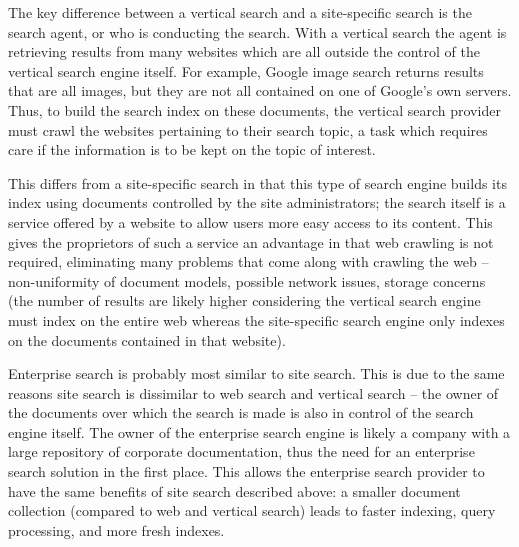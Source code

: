 The key difference between a vertical search and a site-specific search is the search agent, or who is conducting the search.  With a vertical search the agent is retrieving results from many websites which are all outside the control of the vertical search engine itself.  For example, Google image search returns results that are all images, but they are not all contained on one of Google's own servers.  Thus, to build the search index on these documents, the vertical search provider must crawl the websites pertaining to their search topic, a task which requires care if the information is to be kept on the topic of interest.

This differs from a site-specific search in that this type of search engine builds its index using documents controlled by the site administrators; the search itself is a service offered by a website to allow users more easy access to its content.  This gives the proprietors of such a service an advantage in that web crawling is not required, eliminating many problems that come along with crawling the web -- non-uniformity of document models, possible network issues, storage concerns (the number of results are likely higher considering the vertical search engine must index on the entire web whereas the site-specific search engine only indexes on the documents contained in that website).

Enterprise search is probably most similar to site search.  This is due to the same reasons site search is dissimilar to web search and vertical search -- the owner of the documents over which the search is made is also in control of the search engine itself.  The owner of the enterprise search engine is likely a company with a large repository of corporate documentation, thus the need for an enterprise search solution in the first place.  This allows the enterprise search provider to have the same benefits of site search described above: a smaller document collection (compared to web and vertical search) leads to faster indexing, query processing, and more fresh indexes.

